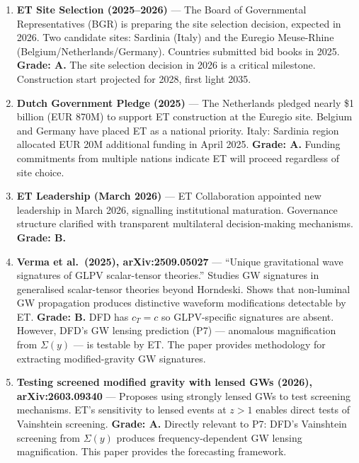 \documentclass[11pt,a4paper]{article}
\begin{document}
\begin{enumerate}

\item \textbf{ET Site Selection (2025--2026)} --- The Board of Governmental Representatives (BGR) is preparing the site selection decision, expected in 2026. Two candidate sites: Sardinia (Italy) and the Euregio Meuse-Rhine (Belgium/Netherlands/Germany). Countries submitted bid books in 2025. \textbf{Grade: A.} The site selection decision in 2026 is a critical milestone. Construction start projected for 2028, first light 2035.

\item \textbf{Dutch Government Pledge (2025)} --- The Netherlands pledged nearly \$1 billion (EUR 870M) to support ET construction at the Euregio site. Belgium and Germany have placed ET as a national priority. Italy: Sardinia region allocated EUR 20M additional funding in April 2025. \textbf{Grade: A.} Funding commitments from multiple nations indicate ET will proceed regardless of site choice.

\item \textbf{ET Leadership (March 2026)} --- ET Collaboration appointed new leadership in March 2026, signalling institutional maturation. Governance structure clarified with transparent multilateral decision-making mechanisms. \textbf{Grade: B.}

\item \textbf{Verma et al.\ (2025), arXiv:2509.05027} --- ``Unique gravitational wave signatures of GLPV scalar-tensor theories.'' Studies GW signatures in generalised scalar-tensor theories beyond Horndeski. Shows that non-luminal GW propagation produces distinctive waveform modifications detectable by ET. \textbf{Grade: B.} DFD has $c_T = c$ so GLPV-specific signatures are absent. However, DFD's GW lensing prediction (P7) --- anomalous magnification from $\Sigma(y)$ --- is testable by ET. The paper provides methodology for extracting modified-gravity GW signatures.

\item \textbf{Testing screened modified gravity with lensed GWs (2026), arXiv:2603.09340} --- Proposes using strongly lensed GWs to test screening mechanisms. ET's sensitivity to lensed events at $z > 1$ enables direct tests of Vainshtein screening. \textbf{Grade: A.} Directly relevant to P7: DFD's Vainshtein screening from $\Sigma(y)$ produces frequency-dependent GW lensing magnification. This paper provides the forecasting framework.

\end{enumerate}
\end{document}
